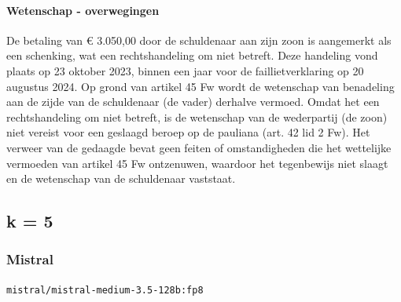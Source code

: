 \documentclass[
  dutch,
  a4paper,
]{article}
\begin{document}
\paragraph{Wetenschap - overwegingen}\label{wetenschap---overwegingen-29}

De betaling van € 3.050,00 door de schuldenaar aan zijn zoon is aangemerkt als een schenking, wat een rechtshandeling om niet betreft. Deze handeling vond plaats op 23 oktober 2023, binnen een jaar voor de faillietverklaring op 20 augustus 2024. Op grond van artikel 45 Fw wordt de wetenschap van benadeling aan de zijde van de schuldenaar (de vader) derhalve vermoed. Omdat het een rechtshandeling om niet betreft, is de wetenschap van de wederpartij (de zoon) niet vereist voor een geslaagd beroep op de pauliana (art. 42 lid 2 Fw). Het verweer van de gedaagde bevat geen feiten of omstandigheden die het wettelijke vermoeden van artikel 45 Fw ontzenuwen, waardoor het tegenbewijs niet slaagt en de wetenschap van de schuldenaar vaststaat.

\newpage


\subsection{k = 5}\label{k-5-3}

\subsubsection{Mistral}\label{mistral-10}

\texttt{mistral/mistral-medium-3.5-128b:fp8}
\end{document}
